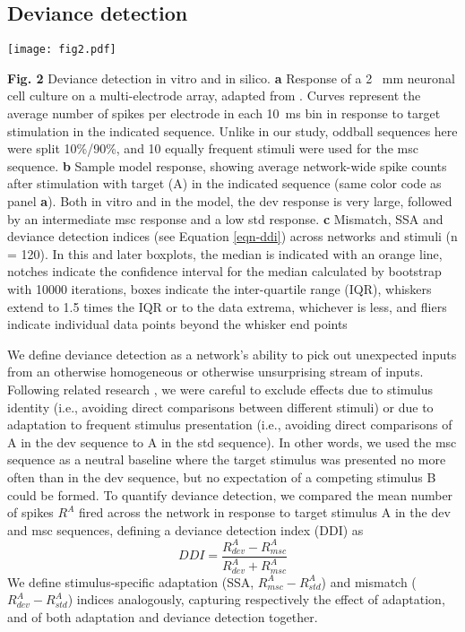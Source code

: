 \documentclass[pdflatex,referee,iicol,sn-basic]{sn-jnl}
\theoremstyle{thmstyleone}%
\theoremstyle{thmstyletwo}%
\theoremstyle{thmstylethree}%
\begin{document}
\subsection{Deviance detection}\label{sec-dd}

\begin{figure*}%
    \centering
    \texttt{[image: fig2.pdf]}
    \caption{}
    \label{fig2}
\end{figure*}
\textbf{Fig. 2} Deviance detection in vitro and in silico. \textbf{a} Response of a 2 ~mm neuronal cell culture on a multi-electrode array, adapted from \cite{Kubota2021-dx}. Curves represent the average number of spikes per electrode in each 10~ms bin in response to target stimulation in the indicated sequence. Unlike in our study, oddball sequences here were split 10\%/90\%, and 10 equally frequent stimuli were used for the msc sequence. \textbf{b} Sample model response, showing average network-wide spike counts after stimulation with target (A) in the indicated sequence (same color code as panel \textbf{a}). Both in vitro and in the model, the dev response is very large, followed by an intermediate msc response and a low std response. \textbf{c} Mismatch, SSA and deviance detection indices (see Equation \ref{eqn-ddi}) across networks and stimuli (n = 120). In this and later boxplots, the median is indicated with an orange line, notches indicate the confidence interval for the median calculated by bootstrap with 10000 iterations, boxes indicate the inter-quartile range (IQR), whiskers extend to 1.5 times the IQR or to the data extrema, whichever is less, and fliers indicate individual data points beyond the whisker end points

We define deviance detection as a network's ability to pick out unexpected inputs from an otherwise homogeneous or otherwise unsurprising stream of inputs. Following related research \citep{Kubota2021-dx,Harms2014-ah,Jacobsen2001-sc}, we were careful to exclude effects due to stimulus identity (i.e., avoiding direct comparisons between different stimuli) or due to adaptation to frequent stimulus presentation (i.e., avoiding direct comparisons of A in the dev sequence to A in the std sequence). In other words, we used the msc sequence as a neutral baseline where the target stimulus was presented no more often than in the dev sequence, but no expectation of a competing stimulus B could be formed. To quantify deviance detection, we compared the mean number of spikes $R^A$ fired across the network in response to target stimulus A in the dev and msc sequences, defining a deviance detection index (DDI) as
\begin{equation}
    DDI = \frac{R^A_{dev} - R^A_{msc}}{R^A_{dev} + R^A_{msc}} \label{eqn-ddi}
\end{equation}
We define stimulus-specific adaptation (SSA, $R^A_{msc} - R^A_{std}$) and mismatch ($R^A_{dev} - R^A_{std}$) indices analogously, capturing respectively the effect of adaptation, and of both adaptation and deviance detection together.
\end{document}
